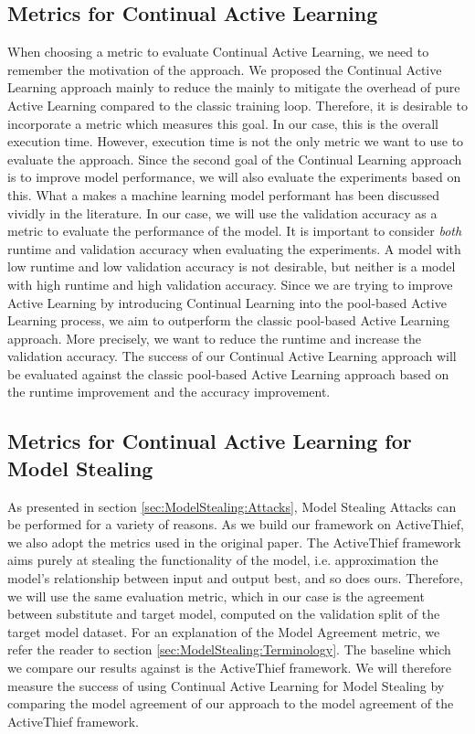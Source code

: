 \subsection{Metrics for Continual Active Learning}
\label{sec:Methodology:Metrics:CAL}
When choosing a metric to evaluate Continual Active Learning, we need to remember the motivation of the approach. We proposed the Continual Active Learning approach
mainly to reduce the mainly to mitigate the overhead of pure Active Learning compared to the classic training loop. Therefore, it is desirable to incorporate a metric
which measures this goal. In our case, this is the overall execution time. However, execution time is not the only metric we want to use to evaluate the approach. Since 
the second goal of the Continual Learning approach is to improve model performance, we will also evaluate the experiments based on this. What a makes a machine learning 
model performant has been discussed vividly in the literature. In our case, we will use the validation accuracy as a metric to evaluate the performance of the model. It is
important to consider \textit{both} runtime and validation accuracy when evaluating the experiments. A model with low runtime and low validation accuracy is not desirable,
but neither is a model with high runtime and high validation accuracy. Since we are trying to improve Active Learning by introducing Continual Learning into the pool-based 
Active Learning process, we aim to outperform the classic pool-based Active Learning approach. More precisely, we want to reduce the runtime and increase the validation
accuracy. The success of our Continual Active Learning approach will be evaluated against the classic pool-based Active Learning approach based on the runtime improvement
and the accuracy improvement. 


\subsection{Metrics for Continual Active Learning for Model Stealing}
\label{sec:Methodlogy:Metrics:CALMS}
As presented in section \ref{sec:ModelStealing:Attacks}, Model Stealing Attacks can be performed for a variety of reasons. As we build our framework on ActiveThief, we also
adopt the metrics used in the original paper. The ActiveThief framework aims purely at stealing the functionality of the model, i.e. approximation the model's relationship
between input and output best, and so does ours. Therefore, we will use the same evaluation metric, which in our case is the agreement between substitute and target model,
computed on the validation split of the target model dataset. For an explanation of the Model Agreement metric, we refer the reader to section \ref{sec:ModelStealing:Terminology}.
The baseline which we compare our results against is the ActiveThief framework. We will therefore measure the success of using Continual Active Learning for Model Stealing by comparing
the model agreement of our approach to the model agreement of the ActiveThief framework.
